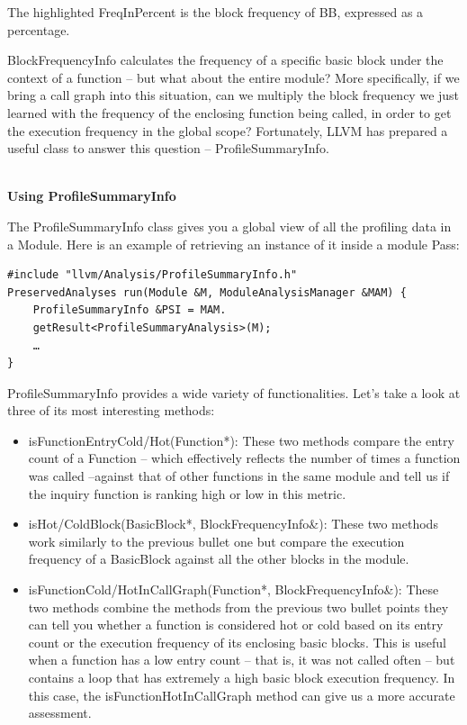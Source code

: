 The highlighted FreqInPercent is the block frequency of BB, expressed as a percentage.

BlockFrequencyInfo calculates the frequency of a specific basic block under the context of a function – but what about the entire module? More specifically, if we bring a call graph into this situation, can we multiply the block frequency we just learned with the frequency of the enclosing function being called, in order to get the execution frequency in the global scope? Fortunately, LLVM has prepared a useful class to answer this question – ProfileSummaryInfo.

\hspace*{\fill} \\ %
\noindent
\textbf{Using ProfileSummaryInfo}

The ProfileSummaryInfo class gives you a global view of all the profiling data in a Module. Here is an example of retrieving an instance of it inside a module Pass:

\begin{lstlisting}[style=styleCXX]
#include "llvm/Analysis/ProfileSummaryInfo.h"
PreservedAnalyses run(Module &M, ModuleAnalysisManager &MAM) {
	ProfileSummaryInfo &PSI = MAM.
	getResult<ProfileSummaryAnalysis>(M);
	…
}
\end{lstlisting}

ProfileSummaryInfo provides a wide variety of functionalities. Let's take a look at three of its most interesting methods:

\begin{itemize}
\item isFunctionEntryCold/Hot(Function*): These two methods compare the entry count of a Function – which effectively reflects the number of times a function was called –against that of other functions in the same module and tell us if the inquiry function is ranking high or low in this metric.

\item isHot/ColdBlock(BasicBlock*, BlockFrequencyInfo\&): These two methods work similarly to the previous bullet one but compare the execution frequency of a BasicBlock against all the other blocks in the module.

\item isFunctionCold/HotInCallGraph(Function*,
BlockFrequencyInfo\&): These two methods combine the methods from the previous two bullet points they can tell you whether a function is considered hot or cold based on its entry count or the execution frequency of its enclosing basic blocks. This is useful when a function has a low entry count – that is, it was not called often – but contains a loop that has extremely a high basic block execution frequency. In this case, the isFunctionHotInCallGraph method can give us a more accurate assessment.

\end{itemize}

